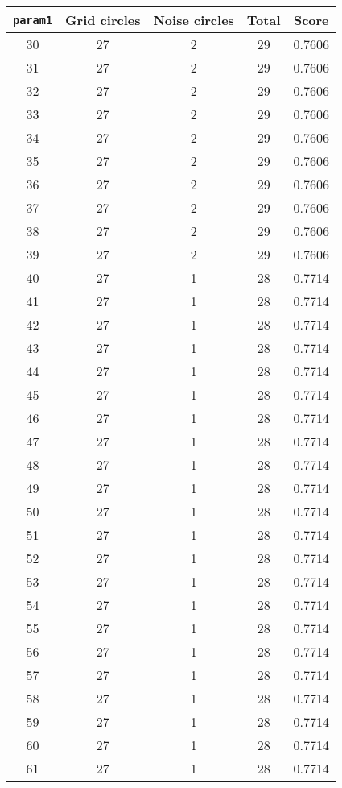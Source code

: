 \documentclass[letterpaper, 12pt]{article}
\begin{document}
\begin{longtable}{|c|c|c|c|c|}
\hline
\textbf{\texttt{param1}} & \textbf{Grid circles} & \textbf{Noise circles} & \textbf{Total} & \textbf{Score} \\
\hline
30 & 27 & 2 & 29 & 0.7606 \\
\hline
31 & 27 & 2 & 29 & 0.7606 \\
\hline
32 & 27 & 2 & 29 & 0.7606 \\
\hline
33 & 27 & 2 & 29 & 0.7606 \\
\hline
34 & 27 & 2 & 29 & 0.7606 \\
\hline
35 & 27 & 2 & 29 & 0.7606 \\
\hline
36 & 27 & 2 & 29 & 0.7606 \\
\hline
37 & 27 & 2 & 29 & 0.7606 \\
\hline
38 & 27 & 2 & 29 & 0.7606 \\
\hline
39 & 27 & 2 & 29 & 0.7606 \\
\hline
40 & 27 & 1 & 28 & 0.7714 \\
\hline
41 & 27 & 1 & 28 & 0.7714 \\
\hline
42 & 27 & 1 & 28 & 0.7714 \\
\hline
43 & 27 & 1 & 28 & 0.7714 \\
\hline
44 & 27 & 1 & 28 & 0.7714 \\
\hline
45 & 27 & 1 & 28 & 0.7714 \\
\hline
46 & 27 & 1 & 28 & 0.7714 \\
\hline
47 & 27 & 1 & 28 & 0.7714 \\
\hline
48 & 27 & 1 & 28 & 0.7714 \\
\hline
49 & 27 & 1 & 28 & 0.7714 \\
\hline
50 & 27 & 1 & 28 & 0.7714 \\
\hline
51 & 27 & 1 & 28 & 0.7714 \\
\hline
52 & 27 & 1 & 28 & 0.7714 \\
\hline
53 & 27 & 1 & 28 & 0.7714 \\
\hline
54 & 27 & 1 & 28 & 0.7714 \\
\hline
55 & 27 & 1 & 28 & 0.7714 \\
\hline
56 & 27 & 1 & 28 & 0.7714 \\
\hline
57 & 27 & 1 & 28 & 0.7714 \\
\hline
58 & 27 & 1 & 28 & 0.7714 \\
\hline
59 & 27 & 1 & 28 & 0.7714 \\
\hline
60 & 27 & 1 & 28 & 0.7714 \\
\hline
61 & 27 & 1 & 28 & 0.7714 \\

\end{longtable}
\end{document}
